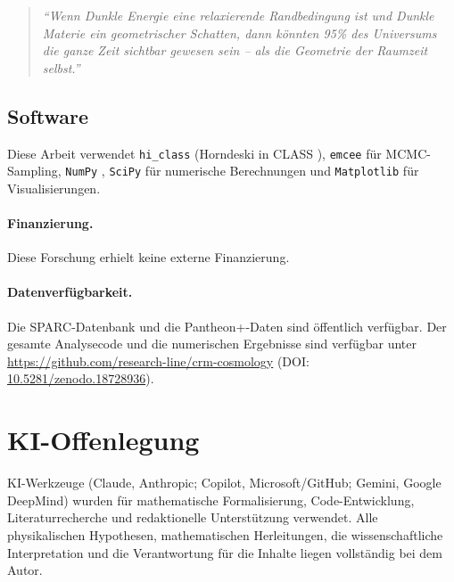 \documentclass[aps,prd,twocolumn,superscriptaddress,nofootinbib,floatfix]{revtex4-2}
\begin{document}
\begin{quote}
\textit{"`Wenn Dunkle Energie eine relaxierende Randbedingung ist und Dunkle Materie ein geometrischer Schatten, dann könnten 95\% des Universums die ganze Zeit sichtbar gewesen sein -- als die Geometrie der Raumzeit selbst."'}
\end{quote}

\subsection*{Software}

Diese Arbeit verwendet \texttt{hi\_class} \cite{Zumalacarregui2017} (Horndeski in CLASS \cite{Blas2011}), \texttt{emcee} \cite{ForemanMackey2013} für MCMC-Sampling, \texttt{NumPy} \cite{Harris2020}, \texttt{SciPy} \cite{Virtanen2020} für numerische Berechnungen und \texttt{Matplotlib} \cite{Hunter2007} für Visualisierungen.

\paragraph{Finanzierung.}
Diese Forschung erhielt keine externe Finanzierung.

\paragraph{Datenverfügbarkeit.}
Die SPARC-Datenbank \cite{Lelli2016} und die Pantheon+-Daten \cite{Scolnic2022}
sind öffentlich verfügbar. Der gesamte Analysecode und die numerischen Ergebnisse
sind verfügbar unter \url{https://github.com/research-line/crm-cosmology}
(DOI: \href{https://doi.org/10.5281/zenodo.18728936}{10.5281/zenodo.18728936}).

\section*{KI-Offenlegung}
KI-Werkzeuge (Claude, Anthropic; Copilot, Microsoft/GitHub; Gemini, Google DeepMind) wurden für mathematische Formalisierung, Code-Entwicklung, Literaturrecherche und redaktionelle Unterstützung verwendet. Alle physikalischen Hypothesen, mathematischen Herleitungen, die wissenschaftliche Interpretation und die Verantwortung für die Inhalte liegen vollständig bei dem Autor.
\end{document}
